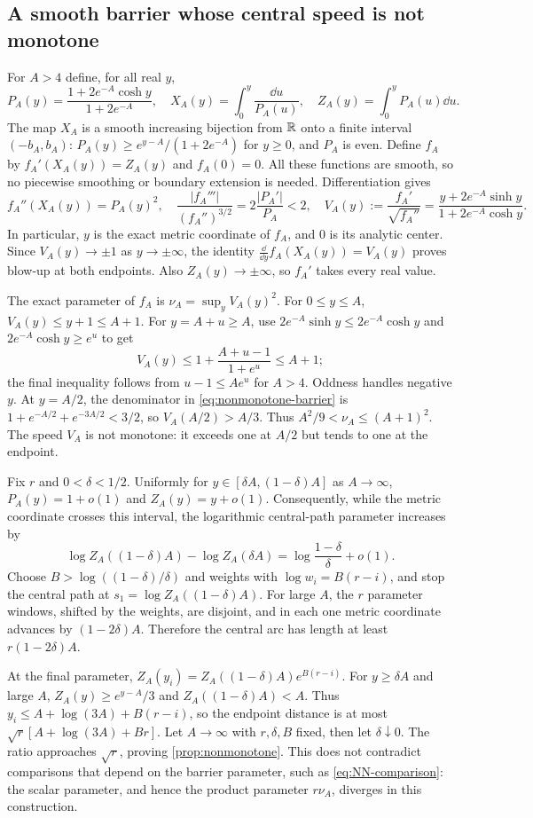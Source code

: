 \subsection{A smooth barrier whose central speed is not monotone}
\label{app:nonmonotone-construction}
For $A>4$ define, for all real $y$,
\[
 P_A(y)=\frac{1+2e^{-A}\cosh y}{1+2e^{-A}},\quad
 X_A(y)=\int_0^y\frac{\dd u}{P_A(u)},\quad
 Z_A(y)=\int_0^y P_A(u)\dd u.
\]
The map $X_A$ is a smooth increasing bijection from $\mathbb R$ onto
a finite interval $(-b_A,b_A)$: $P_A(y)\geq
e^{y-A}/(1+2e^{-A})$ for $y\geq0$, and $P_A$ is even.
Define $f_A$ by $f_A'(X_A(y))=Z_A(y)$ and $f_A(0)=0$.
All these functions are smooth, so no piecewise smoothing or boundary
extension is needed.
Differentiation gives
\begin{equation}
 f_A''(X_A(y))=P_A(y)^2,
 \quad\frac{|f_A'''|}{(f_A'')^{3/2}}=
        2\frac{|P_A'|}{P_A}<2,
 \quad V_A(y):=\frac{f_A'}{\sqrt{f_A''}}
 =\frac{y+2e^{-A}\sinh y}{1+2e^{-A}\cosh y}.
 \label{eq:nonmonotone-barrier}
\end{equation}
In particular, $y$ is the exact metric coordinate of $f_A$, and $0$ is
its analytic center. Since $V_A(y)\to\pm1$ as $y\to\pm\infty$,
the identity $\frac{\dd}{\dd y}f_A(X_A(y))=V_A(y)$ proves blow-up
at both endpoints. Also $Z_A(y)\to\pm\infty$,
so $f_A'$ takes every real value.

The exact parameter of $f_A$ is $\nu_A=\sup_y V_A(y)^2$.
For $0\leq y\leq A$, $V_A(y)\leq y+1\leq A+1$.
For $y=A+u\geq A$, use $2e^{-A}\sinh y\leq2e^{-A}\cosh y$
and $2e^{-A}\cosh y\geq e^u$ to get
\[
 V_A(y)\leq1+\frac{A+u-1}{1+e^u}\leq A+1;
\]
the final inequality follows from $u-1\leq Ae^u$ for $A>4$.
Oddness handles negative $y$. At $y=A/2$, the denominator in
\eqref{eq:nonmonotone-barrier} is
$1+e^{-A/2}+e^{-3A/2}<3/2$, so $V_A(A/2)>A/3$.
Thus $A^2/9<\nu_A\leq(A+1)^2$. The speed $V_A$ is not monotone:
it exceeds one at $A/2$ but tends to one at the endpoint.

Fix $r$ and $0<\delta<1/2$. Uniformly for
$y\in[\delta A,(1-\delta)A]$ as $A\to\infty$,
$P_A(y)=1+o(1)$ and $Z_A(y)=y+o(1)$.
Consequently, while the metric coordinate crosses this interval, the
logarithmic central-path parameter increases by
\[
 \log Z_A((1-\delta)A)-\log Z_A(\delta A)
 =\log\frac{1-\delta}{\delta}+o(1).
\]
Choose $B>\log((1-\delta)/\delta)$ and weights with
$\log w_i=B(r-i)$, and stop the central path at
$s_1=\log Z_A((1-\delta)A)$. For large $A$, the $r$ parameter windows,
shifted by the weights, are disjoint, and in each one metric coordinate
advances by $(1-2\delta)A$. Therefore the central arc has length at
least $r(1-2\delta)A$.

At the final parameter, $Z_A(y_i)=Z_A((1-\delta)A)e^{B(r-i)}$.
For $y\geq\delta A$ and large $A$,
$Z_A(y)\geq e^{y-A}/3$ and
$Z_A((1-\delta)A)<A$. Thus
$y_i\leq A+\log(3A)+B(r-i)$, so the endpoint distance is at most
$\sqrt r[A+\log(3A)+Br]$.
Let $A\to\infty$ with $r,\delta,B$ fixed, then let
$\delta\downarrow0$. The ratio approaches $\sqrt r$, proving
\cref{prop:nonmonotone}. This does not contradict comparisons that
depend on the barrier parameter, such as \eqref{eq:NN-comparison}: the
scalar parameter, and hence the product parameter $r\nu_A$, diverges in
this construction.
